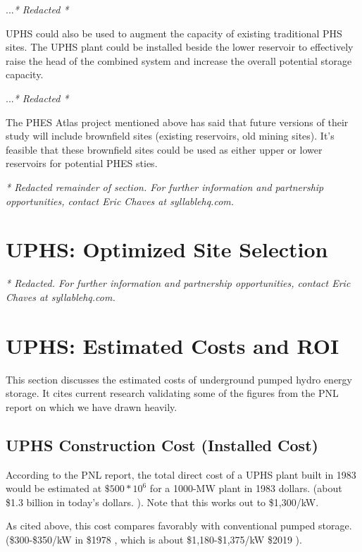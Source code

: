 \documentclass[hidelinks,12pt,a4paper]{article}
\begin{document}
...\textit{* Redacted *}

UPHS could also be used to augment the capacity of existing traditional PHS sites. The UPHS plant could be installed beside the lower reservoir to effectively raise the head of the combined system and increase the overall potential storage capacity.

...\textit{* Redacted *}

The PHES Atlas project mentioned above has said that future versions of their study will include brownfield sites (existing reservoirs, old mining sites). It's feasible that these brownfield sites could be used as either upper or lower reservoirs for potential PHES sties.

\textit{* Redacted remainder of section. For further information and partnership opportunities, contact Eric Chaves at syllablehq.com.}

\pagebreak[3]
\section{UPHS: Optimized Site Selection}

\textit{* Redacted. For further information and partnership opportunities, contact Eric Chaves at syllablehq.com.}


\pagebreak[4]
\section{UPHS: Estimated Costs and ROI}
This section discusses the estimated costs of underground pumped hydro energy storage. It cites current research validating some of the figures from the PNL report on which we have drawn heavily.

\subsection{UPHS Construction Cost (Installed Cost)}

According to the PNL report, the total direct cost of a UPHS plant built in 1983 would be estimated at $\$500 * 10^6$ for a 1000-MW plant in 1983 dollars.\cite{UndergroundPumpedHydroelectricStorage} (about \$1.3 billion in today's dollars. \cite{CPIInflationCalculator}). Note that this works out to \$1,300/kW.

As cited above, this cost compares favorably with conventional pumped storage. (\$300-\$350/kW in \$1978 \cite{UndergroundPumpedHydroelectricStorage}, which is about \$1,180-\$1,375/kW \$2019 \cite{CPIInflationCalculator}).
\end{document}
